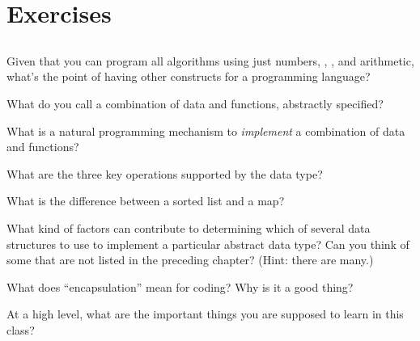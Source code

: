 \section{Exercises}

\subsection{\ReviewQuestions}

\begin{exercise}
  Given that you can program all algorithms using just numbers,
  , , and arithmetic, what's the point of having
  other constructs for a programming language?
\end{exercise}

\begin{exercise}
  What do you call a combination of data and functions, abstractly
  specified?
\end{exercise}

\begin{exercise}
  What is a natural programming mechanism to \emph{implement} a
  combination of data and functions?
\end{exercise}

\begin{exercise}
  What are the three key operations supported by the  data
  type?
\end{exercise}

\begin{exercise}
  What is the difference between a sorted list and a map?
\end{exercise}

\begin{exercise}
  What kind of factors can contribute to determining which of several
  data structures to use to implement a particular abstract data type?
  Can you think of some that are not listed in the preceding chapter?
  (Hint: there are many.)
\end{exercise}

\begin{exercise}
  What does ``encapsulation'' mean for coding? Why is it a good thing?
\end{exercise}

\begin{exercise}
  At a high level, what are the important things you are supposed to
  learn in this class?
\end{exercise}
